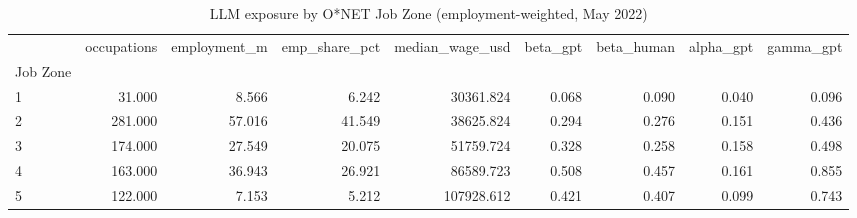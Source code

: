 \begin{table}
\caption{LLM exposure by O*NET Job Zone (employment-weighted, May 2022)}
\label{tab:table1_exposure_by_job_zone}
\begin{tabular}{lrrrrrrrr}
\toprule
 & occupations & employment\_m & emp\_share\_pct & median\_wage\_usd & beta\_gpt & beta\_human & alpha\_gpt & gamma\_gpt \\
Job Zone &  &  &  &  &  &  &  &  \\
\midrule
1 & 31.000 & 8.566 & 6.242 & 30361.824 & 0.068 & 0.090 & 0.040 & 0.096 \\
2 & 281.000 & 57.016 & 41.549 & 38625.824 & 0.294 & 0.276 & 0.151 & 0.436 \\
3 & 174.000 & 27.549 & 20.075 & 51759.724 & 0.328 & 0.258 & 0.158 & 0.498 \\
4 & 163.000 & 36.943 & 26.921 & 86589.723 & 0.508 & 0.457 & 0.161 & 0.855 \\
5 & 122.000 & 7.153 & 5.212 & 107928.612 & 0.421 & 0.407 & 0.099 & 0.743 \\
\bottomrule
\end{tabular}
\end{table}

